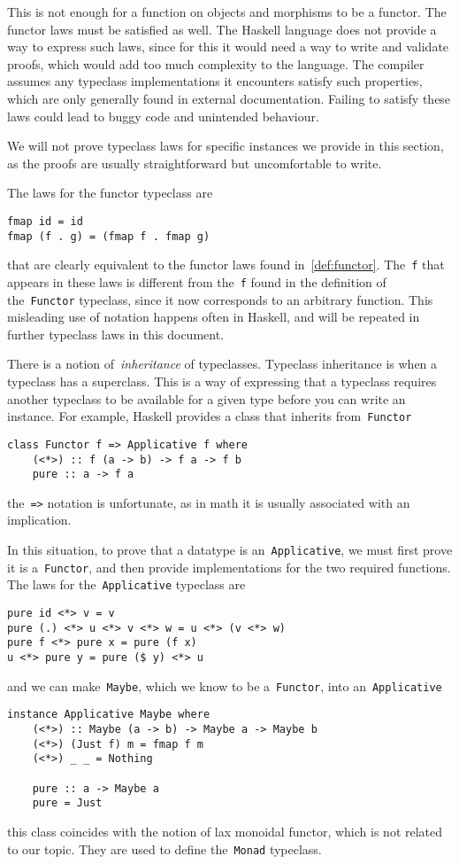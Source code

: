 \documentclass[a4paper]{article}
\theoremstyle{plain}
\theoremstyle{definition}
\begin{document}
This is not enough for a function on objects and morphisms to be a functor. The
functor laws must be satisfied as well. The Haskell language does not provide a
way to express such laws, since for this it would need a way to write and
validate proofs, which would add too much complexity to the language. The
compiler assumes any typeclass implementations it encounters satisfy such
properties, which are only generally found in external documentation. Failing to
satisfy these laws could lead to buggy code and unintended behaviour.

We will not prove typeclass laws for specific instances we provide in this
section, as the proofs are usually straightforward but uncomfortable to write.

The laws for the functor typeclass are
\begin{verbatim}
fmap id = id
fmap (f . g) = (fmap f . fmap g)
\end{verbatim}
that are clearly equivalent to the functor laws found in~\ref{def:functor}.
The~\texttt{f} that appears in these laws is different from
the~\texttt{f} found in the definition of
the~\texttt{Functor} typeclass, since it now corresponds to an
arbitrary function. This misleading use of notation happens often in Haskell,
and will be repeated in further typeclass laws in this document.

There is a notion of~\emph{inheritance} of typeclasses. Typeclass inheritance is
when a typeclass has a superclass. This is a way of expressing that a typeclass
requires another typeclass to be available for a given type before you can write
an instance. For example, Haskell provides a class that inherits
from~\texttt{Functor}
\begin{verbatim}
class Functor f => Applicative f where
    (<*>) :: f (a -> b) -> f a -> f b
    pure :: a -> f a
\end{verbatim}
the~\texttt{=>} notation is unfortunate, as in math it is usually
associated with an implication.

In this situation, to prove that a datatype is
an~\texttt{Applicative}, we must first prove it is
a~\texttt{Functor}, and then provide implementations for the two
required functions.
The laws for the~\texttt{Applicative} typeclass are
\begin{verbatim}
pure id <*> v = v
pure (.) <*> u <*> v <*> w = u <*> (v <*> w)
pure f <*> pure x = pure (f x)
u <*> pure y = pure ($ y) <*> u
\end{verbatim}
and we can make~\texttt{Maybe}, which we know to be
a~\texttt{Functor}, into an~\texttt{Applicative}
\begin{verbatim}
instance Applicative Maybe where
    (<*>) :: Maybe (a -> b) -> Maybe a -> Maybe b
    (<*>) (Just f) m = fmap f m
    (<*>) _ _ = Nothing

    pure :: a -> Maybe a
    pure = Just
\end{verbatim}
this class coincides with the notion of lax monoidal functor, which is not
related to our topic. They are used to define the~\texttt{Monad}
typeclass.
\end{document}
